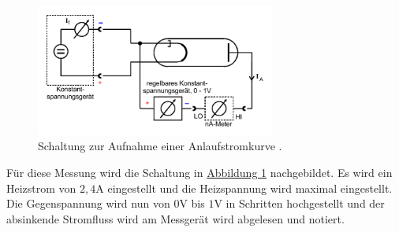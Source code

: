 \begin{figure}
    \centering
    \includegraphics[width=0.7\textwidth]{pictures/Aufbau2.pdf}
    \caption{Schaltung zur Aufnahme einer Anlaufstromkurve \cite{v504}.}
    \label{fig:Aufbau2}
\end{figure}

Für diese Messung wird die Schaltung in \hyperref[fig:Aufbau2]{Abbildung \ref{fig:Aufbau2}} nachgebildet.
Es wird ein Heizstrom von $2,4 \unit\ampere$ eingestellt und die Heizspannung wird maximal eingestellt.
Die Gegenspannung wird nun von $0 \unit\volt$ bis $ 1 \unit\volt$ in Schritten hochgestellt
und der absinkende Stromfluss wird am Messgerät wird abgelesen und notiert.